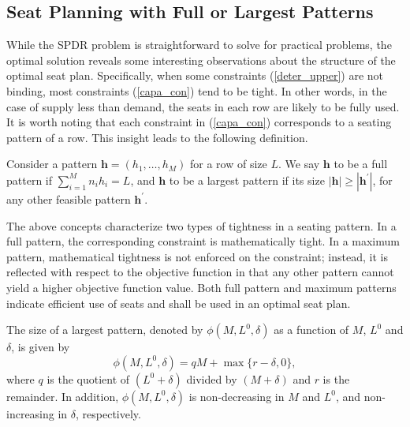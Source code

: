 \subsection{Seat Planning with Full or Largest Patterns}\label{seat_planning_full_largest}
While the SPDR problem is straightforward to solve for practical problems, the optimal solution reveals some interesting observations about the structure of the optimal seat plan. Specifically, when some constraints (\ref{deter_upper}) are not binding, most constraints (\ref{capa_con}) tend to be tight. In other words, in the case of supply less than demand, the seats in each row are likely to be fully used. It is worth noting that each constraint in (\ref{capa_con}) corresponds to a seating pattern of a row.
This insight leads to the following definition.

\begin{definition}
Consider a pattern $\bm{h} = (h_1, \ldots, h_M)$ for a row of size $L$. We say $\bm{h}$ to be a full pattern if $\sum_{i=1}^{M} n_i h_i = L$, and $\bm{h}$ to be a largest pattern if its size $|\bm{h}| \geq |\bm{h}^{\prime}|$, for any other feasible pattern $\bm{h}^{\prime}$.
\end{definition}

The above concepts characterize two types of tightness in a seating pattern. In a full pattern, the corresponding constraint is mathematically tight. In a maximum pattern, mathematical tightness is not enforced on the constraint; instead, it is reflected with respect to the objective function in that any other pattern cannot yield a higher objective function value. Both full pattern and maximum patterns indicate efficient  use of seats and shall be used in an optimal seat plan.


\begin{prop}\label{lem_pattern}
The size of a largest pattern, denoted by $\phi(M, L^{0}, \delta)$ as a function of $M$, $L^{0}$ and $\delta$, is given by $$\phi(M, L^{0}, \delta) = q M + \max\{r-\delta, 0\},$$ where $q$ is the quotient of $(L^{0} + \delta)$ divided by $(M+\delta)$ and $r$ is the remainder. In addition, $\phi(M, L^{0}, \delta)$ is non-decreasing in $M$ and $L^{0}$, and non-increasing in $\delta$, respectively. 
\end{prop}

